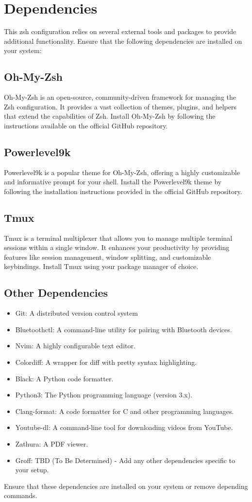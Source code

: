 \documentclass{article}
\begin{document}
\section{Dependencies}
This zsh configuration relies on several external tools and packages to provide 
additional functionality. Ensure that the following dependencies are installed 
on your system:

\subsection{Oh-My-Zsh}
Oh-My-Zsh is an open-source, community-driven framework for managing the Zsh 
configuration. It provides a vast collection of themes, plugins, and helpers 
that extend the capabilities of Zsh. Install Oh-My-Zsh by following the 
instructions available on the official GitHub repository.

\subsection{Powerlevel9k}
Powerlevel9k is a popular theme for Oh-My-Zsh, offering a highly customizable 
and informative prompt for your shell. Install the Powerlevel9k theme by 
following the installation instructions provided in the official GitHub repository.

\subsection{Tmux}
Tmux is a terminal multiplexer that allows you to manage multiple terminal 
sessions within a single window. It enhances your productivity by providing 
features like session management, window splitting, and customizable keybindings. 
Install Tmux using your package manager of choice.

\subsection{Other Dependencies}

\begin{itemize}
  \item Git: A distributed version control system
  \item Bluetoothctl: A command-line utility for pairing with Bluetooth devices.
  \item Nvim: A highly configurable text editor.
  \item Colordiff: A wrapper for diff with pretty syntax highlighting.
  \item Black: A Python code formatter.
  \item Python3: The Python programming language (version 3.x).
  \item Clang-format: A code formatter for C and other programming languages.
  \item Youtube-dl: A command-line tool for downloading videos from YouTube.
  \item Zathura: A PDF viewer.
  \item Groff: TBD (To Be Determined) - Add any other dependencies specific to your setup.
\end{itemize}

Ensure that these dependencies are installed on your system or remove depending
commands.
\end{document}

